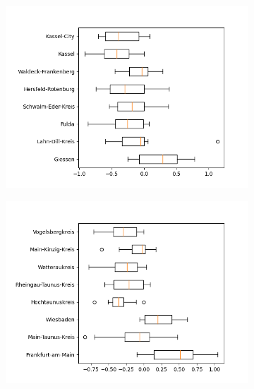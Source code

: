 \begin{figure}
	\centering
	\begin{subfigure}[b]{0.4\textwidth}
		\centering
		\includegraphics[width=\textwidth]{./figures/50d/deviation_box50_alt1.png}	
	\end{subfigure}
	\begin{subfigure}[b]{0.4\textwidth}
		\centering
		\includegraphics[width=\textwidth]{./figures/50d/deviation_box50_alt2.png}	
	\end{subfigure}
	\begin{subfigure}[b]{0.4\textwidth}
		\centering

\end{subfigure}
\end{figure}
